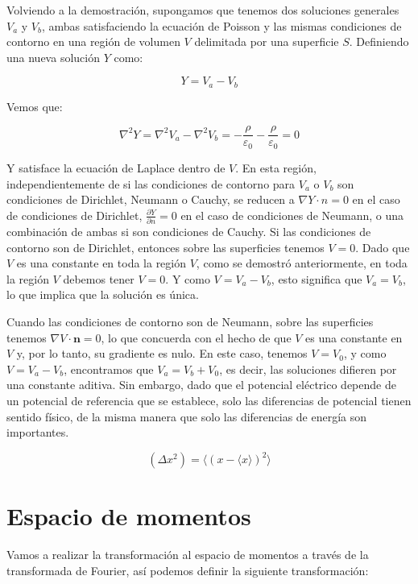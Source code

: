 \documentclass[a4,12pt]{aleph-notas}
\begin{document}
Volviendo a la demostración, supongamos que tenemos dos soluciones generales \(V_a\) y \(V_b\), ambas satisfaciendo la ecuación de Poisson y las mismas condiciones de contorno en una región de volumen \(V\) delimitada por una superficie \(S\). Definiendo una nueva solución \(Y\) como:

\[Y = V_a - V_b\]

Vemos que:

\[
\nabla^2 Y = \nabla^2 V_a - \nabla^2 V_b = -\frac{\rho}{\varepsilon_0} - \frac{\rho}{\varepsilon_0} = 0
\]

Y satisface la ecuación de Laplace dentro de \(V\). En esta región, independientemente de si las condiciones de contorno para \(V_a\) o \(V_b\) son condiciones de Dirichlet, Neumann o Cauchy, se reducen a \(\nabla Y \cdot n = 0\) en el caso de condiciones de Dirichlet, \(\frac{\partial Y}{\partial n} = 0\) en el caso de condiciones de Neumann, o una combinación de ambas si son condiciones de Cauchy.
Si las condiciones de contorno son de Dirichlet, entonces sobre las superficies tenemos \(V = 0\). Dado que \(V\) es una constante en toda la región \(V\), como se demostró anteriormente, en toda la región \(V\) debemos tener \(V = 0\). Y como \(V = V_a - V_b\), esto significa que \(V_a = V_b\), lo que implica que la solución es única.

Cuando las condiciones de contorno son de Neumann, sobre las superficies tenemos \(\nabla V \cdot \mathbf{n} = 0\), lo que concuerda con el hecho de que \(V\) es una constante en \(V\) y, por lo tanto, su gradiente es nulo. En este caso, tenemos \(V = V_0\), y como \(V = V_a - V_b\), encontramos que \(V_a = V_b + V_0\), es decir, las soluciones difieren por una constante aditiva. Sin embargo, dado que el potencial eléctrico depende de un potencial de referencia que se establece, solo las diferencias de potencial tienen sentido físico, de la misma manera que solo las diferencias de energía son importantes.

\begin{equation}
    \left( \Delta x^2\right)=\langle(x-\langle x\rangle)^2 \rangle
 \end{equation}
\section{Espacio de momentos}

Vamos a realizar la transformación al espacio de momentos a través de la transformada de Fourier, así podemos definir la siguiente transformación:
\end{document}
